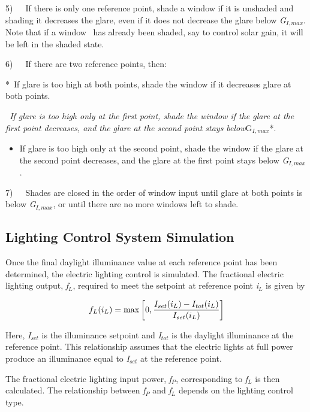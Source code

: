 5)~~~If there is only one reference point, shade a window if it is unshaded and shading it decreases the glare, even if it does not decrease the glare below \emph{G\(_{I,max}\)}. Note that if a window~ has already been shaded, say to control solar gain, it will be left in the shaded state.

6)~~~If there are two reference points, then:

*~If glare is too high at both points, shade the window if it decreases glare at both points.

\emph{~If glare is too high only at the first point, shade the window if the glare at the first point decreases, and the glare at the second point stays below}G\(_{I,max}\)*.

\begin{itemize}
\tightlist
\item
  If glare is too high only at the second point, shade the window if the glare at the second point decreases, and the glare at the first point stays below \emph{G\(_{I,max}\)}.
\end{itemize}

7)~~~Shades are closed in the order of window input until glare at both points is below \emph{G\(_{I,max}\)}, or until there are no more windows left to shade.

\subsection{Lighting Control System Simulation}\label{lighting-control-system-simulation}

Once the final daylight illuminance value at each reference point has been determined, the electric lighting control is simulated. The fractional electric lighting output, \emph{f\(_{L}\)}, required to meet the setpoint at reference point \emph{i\(_{L}\)} is given by

\begin{equation}
{f_L}({i_L}) = {\rm{max}}\left[ {0,\frac{{{I_{set}}({i_L}) - {I_{tot}}({i_L})}}{{{I_{set}}({i_L})}}} \right]
\end{equation}

Here, \emph{I\(_{set}\)} is the illuminance setpoint and \emph{I\(_{tot}\)} is the daylight illuminance at the reference point. This relationship assumes that the electric lights at full power produce an illuminance equal to \emph{I\(_{set}\)} at the reference point.

The fractional electric lighting input power, \emph{f\(_{P}\)}, corresponding to \emph{f\(_{L}\)} is then calculated. The relationship between \emph{f\(_{P}\)} and \emph{f\(_{L}\)} depends on the lighting control type.

